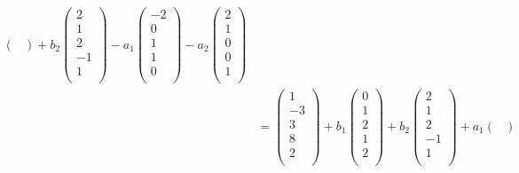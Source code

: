 \documentclass{ctexart}
\begin{document}
\begin{solution}
\begin{align*}
\begin{pmatrix}
        \end{pmatrix}+b_2\begin{pmatrix}
            2 \\
            1 \\
            2 \\
            -1 \\
            1 \\
        \end{pmatrix}-a_1\begin{pmatrix}
            -2 \\
            0 \\
            1 \\
            1 \\
            0 \\
        \end{pmatrix}-a_2\begin{pmatrix}
            2 \\
            1 \\
            0 \\
            0 \\
            1 \\
        \end{pmatrix} \\
        & =\begin{pmatrix}
            1 \\
            -3 \\
            3 \\
            8 \\
            2 \\
        \end{pmatrix}+b_1\begin{pmatrix}
            0 \\
            1 \\
            2 \\
            1 \\
            2 \\
        \end{pmatrix}+b_2\begin{pmatrix}
            2 \\
            1 \\
            2 \\
            -1 \\
            1 \\
        \end{pmatrix}+a_1\begin{pmatrix}

\end{pmatrix}
\end{align*}
\end{solution}
\end{document}
